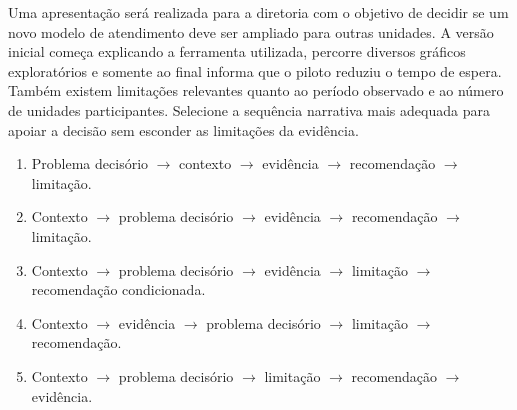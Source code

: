 \documentclass[12pt,a4paper]{article}
\begin{document}
\TextoBase
Uma apresentação será realizada para a diretoria com o objetivo de decidir se um novo modelo de atendimento deve ser ampliado para outras unidades. A versão inicial começa explicando a ferramenta utilizada, percorre diversos gráficos exploratórios e somente ao final informa que o piloto reduziu o tempo de espera. Também existem limitações relevantes quanto ao período observado e ao número de unidades participantes.
\FonteDidatica
\Comando Selecione a sequência narrativa mais adequada para apoiar a decisão sem esconder as limitações da evidência.
\begin{enumerate}[label=\Alph*)]
\item Problema decisório $\rightarrow$ contexto $\rightarrow$ evidência $\rightarrow$ recomendação $\rightarrow$ limitação.
\item Contexto $\rightarrow$ problema decisório $\rightarrow$ evidência $\rightarrow$ recomendação $\rightarrow$ limitação.
\item Contexto $\rightarrow$ problema decisório $\rightarrow$ evidência $\rightarrow$ limitação $\rightarrow$ recomendação condicionada.
\item Contexto $\rightarrow$ evidência $\rightarrow$ problema decisório $\rightarrow$ limitação $\rightarrow$ recomendação.
\item Contexto $\rightarrow$ problema decisório $\rightarrow$ limitação $\rightarrow$ recomendação $\rightarrow$ evidência.
\end{enumerate}
\end{document}
